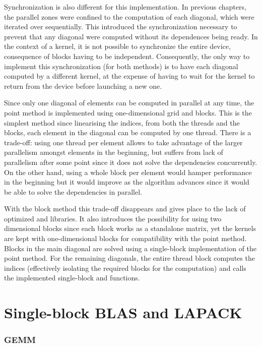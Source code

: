 \documentclass[../thesis]{subfiles}
\begin{document}
	Synchronization is also different for this implementation. In previous chapters, the parallel zones were confined to the computation of each diagonal, which were iterated over sequentially. This introduced the synchronization necessary to prevent that any diagonal were computed without its dependences being ready. In the context of a \cuda kernel, it is not possible to synchronize the entire device, consequence of blocks having to be independent. Consequently, the only way to implement this synchronization (for both methods) is to have each diagonal computed by a different kernel, at the expense of having to wait for the kernel to return from the device before launching a new one.

	Since only one diagonal of elements can be computed in parallel at any time, the point method is implemented using one-dimensional grid and blocks. This is the simplest method since linearising the indices, from both the threads and the blocks, each element in the diagonal can be computed by one thread. There is a trade-off: using one thread per element allows to take advantage of the larger parallelism amongst elements in the beginning, but suffers from lack of parallelism after some point since it does not solve the dependencies concurrently. On the other hand, using a whole block per element would hamper performance in the beginning but it would improve as the algorithm advances since it would be able to solve the dependencies in parallel.

	With the block method this trade-off disappears and gives place to the lack of optimized \blas and \lapack libraries. It also introduces the possibility for using two dimensional blocks since each block works as a standalone matrix, yet the kernels are kept with one-dimensional blocks for compatibility with the point method. Blocks in the main diagonal are solved using a single-block implementation of the point method. For the remaining diagonals, the entire thread block computes the indices (effectively isolating the required blocks for the computation) and calls the implemented single-block \blas and \lapack functions.

	\section{Single-block BLAS and LAPACK}
		\subsubsection{GEMM}
\end{document}
